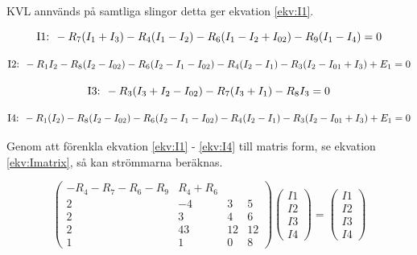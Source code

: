 \documentclass[a4paper,12pt]{article}
\begin{document}
KVL annvänds på samtliga slingor detta ger ekvation \ref{ekv:I1}.

\begin{equation}
\text{I1: }-R_7(I_1+I_3)-R_4(I_1-I_2)-R_6(I_1-I_2+I_{02})-R_9(I_1-I_4)=0 \\
\label{ekv:I1}
\end{equation}

\begin{equation}
\text{I2: }-R_1I_2-R_8(I_2-I_{02})-R_6(I_2-I_1-I_{02})-R_4(I_2-I_1)-R_3(I_2-I_{01}+I_3)+E_1=0 \\
\label{ekv:I2}
\end{equation}

\begin{equation}
\text{I3: }-R_3(I_3+I_2-I_{02})-R_7(I_3+I_1)-R_8I_3=0 \\
\label{ekv:I3}
\end{equation}

\begin{equation}
\text{I4: }-R_1(I_2)-R_8(I_2-I_{02})-R_6(I_2-I_1-I_{02})-R_4(I_2-I_1)-R_3(I_2-I_{01}+I_3)+E_1=0 \\
\label{ekv:I4}
\end{equation}

Genom att förenkla ekvation \ref{ekv:I1} - \ref{ekv:I4} till matris form, se ekvation \ref{ekv:Imatrix}, så kan strömmarna beräknas.

\begin{equation}
\begin{pmatrix}
   -R_4-R_7-R_6-R_9 & R_4+R_6 &  \\
  2 & -4 & 3 & 5 \\
  2 & 3 & 4 & 6 \\
  2 & 43 & 12 & 12 \\
  1 & 1 & 0 & 8
 \end{pmatrix}
 \begin{pmatrix}
    I1 \\
    I2 \\
    I3 \\
    I4
  \end{pmatrix}
 =
 \begin{pmatrix}
    I1 \\
    I2 \\
    I3 \\
    I4
  \end{pmatrix}
\label{ekv:Imatrix}
\end{equation}
\end{document}

